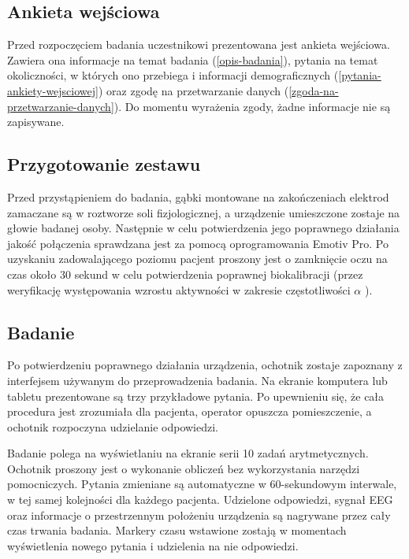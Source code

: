 \documentclass{./assets/wfis}
\begin{document}
\subsection{Ankieta wejściowa}
Przed rozpoczęciem badania uczestnikowi prezentowana jest ankieta wejściowa. Zawiera ona informacje na temat badania (\autoref{opis-badania}), pytania na temat okoliczności, w których ono przebiega i informacji demograficznych (\autoref{pytania-ankiety-wejsciowej}) oraz zgodę na przetwarzanie danych (\autoref{zgoda-na-przetwarzanie-danych}). Do momentu wyrażenia zgody, żadne informacje nie są zapisywane.

\subsection{Przygotowanie zestawu}
Przed przystąpieniem do badania, gąbki montowane na zakończeniach elektrod zamaczane są w roztworze soli fizjologicznej, a urządzenie umieszczone zostaje na głowie badanej osoby. Następnie w celu potwierdzenia jego poprawnego działania jakość połączenia sprawdzana jest za pomocą oprogramowania Emotiv Pro\cite{emotiv_inc_epoc_nodate}. Po uzyskaniu zadowalającego poziomu pacjent proszony jest o zamknięcie oczu na czas około 30 sekund w celu potwierdzenia poprawnej biokalibracji (przez weryfikację występowania wzrostu aktywności w zakresie częstotliwości $\alpha$ \cite{britton_electroencephalography_2016}).

\subsection{Badanie}
Po potwierdzeniu poprawnego działania urządzenia, ochotnik zostaje zapoznany z interfejsem używanym do przeprowadzenia badania. Na ekranie komputera lub tabletu prezentowane są trzy przykładowe pytania. Po upewnieniu się, że cała procedura jest zrozumiała dla pacjenta, operator opuszcza pomieszczenie, a ochotnik rozpoczyna udzielanie odpowiedzi.

Badanie polega na wyświetlaniu na ekranie  serii 10 zadań arytmetycznych. Ochotnik proszony jest o wykonanie obliczeń bez wykorzystania narzędzi pomocniczych. Pytania zmieniane są automatyczne w 60-sekundowym interwale, w tej samej kolejności dla każdego pacjenta. Udzielone odpowiedzi, sygnał EEG oraz informacje o przestrzennym położeniu urządzenia są nagrywane przez cały czas trwania badania. Markery czasu wstawione zostają w momentach wyświetlenia nowego pytania i udzielenia na nie odpowiedzi.
\end{document}
